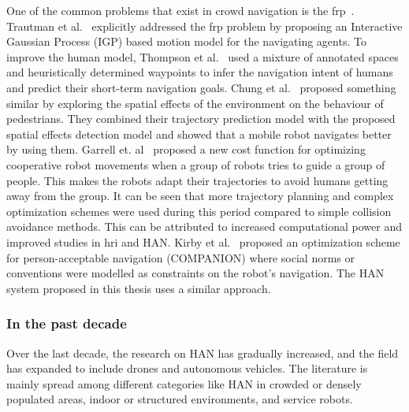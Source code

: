 One of the common problems that exist in crowd navigation is the \acrfull{frp}~\cite{trautman2010unfreezing}. Trautman et al.~\cite{trautman2010unfreezing} explicitly addressed the \acrshort{frp} problem by proposing an Interactive Gaussian Process (IGP) based motion model for the navigating agents.  To improve the human model, Thompson et al.~\cite{thompson2009probabilistic} used a mixture of annotated spaces and heuristically determined waypoints to infer the navigation intent of humans and predict their short-term navigation goals. Chung et al.~\cite{chung2010mobile} proposed something similar by exploring the spatial effects of the environment on the behaviour of pedestrians. They combined their trajectory prediction model with the proposed spatial effects detection model and showed that a mobile robot navigates better by using them. Garrell et. al~\cite{garrell2010local} proposed a new cost function for optimizing cooperative robot movements when a group of robots tries to guide a group of people. This makes the robots adapt their trajectories to avoid humans getting away from the group. It can be seen that more trajectory planning and complex optimization schemes were used during this period compared to simple collision avoidance methods. This can be attributed to increased computational power and improved studies in \acrshort{hri} and HAN. Kirby et al.~\cite{kirby2009companion} proposed an optimization scheme for person-acceptable navigation (COMPANION) where social norms or conventions were modelled as constraints on the robot’s navigation. The HAN system proposed in this thesis uses a similar approach.

\subsubsection{In the past decade}

Over the last decade, the research on HAN has gradually increased, and the field has expanded to include drones and autonomous vehicles. The literature is mainly spread among different categories like HAN in crowded or densely populated areas, indoor or structured environments, and service robots. 

